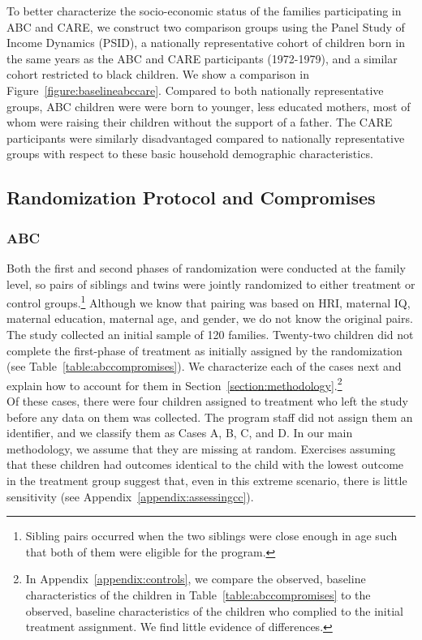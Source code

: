 \noindent To better characterize the socio-economic status of the families participating in ABC and CARE, we construct two comparison groups using the Panel Study of Income Dynamics (PSID), a nationally representative cohort of children born in the same years as the ABC and CARE participants (1972-1979), and a similar cohort restricted to black children. We show a comparison in Figure~\ref{figure:baselineabccare}. Compared to both nationally representative groups, ABC children were were born to younger, less educated mothers, most of whom were raising their children without the support of a father. The CARE participants were similarly disadvantaged compared to nationally representative groups with respect to these basic household demographic characteristics.\\

\subsection{Randomization Protocol and Compromises} \label{section:randomization}

\subsubsection{ABC}

\noindent Both the first and second phases of randomization were conducted at the family level, so pairs of siblings and twins were jointly randomized to either treatment or control groups.\footnote{Sibling pairs occurred when the two siblings were close enough in age such that both of them were eligible for the program.} Although we know that pairing was based on HRI, maternal IQ, maternal education, maternal age, and gender, we do not know the original pairs. The study collected an initial sample of 120 families. Twenty-two children did not complete the first-phase of treatment as initially assigned by the randomization (see Table~\ref{table:abccompromises}). We characterize each of the cases next and explain how to account for them in Section~\ref{section:methodology}.\footnote{In Appendix~\ref{appendix:controls}, we compare the observed, baseline characteristics of the children in Table~\ref{table:abccompromises} to the observed, baseline characteristics of the children who complied to the initial treatment assignment. We find little evidence of differences.}\\

\noindent Of these cases, there were four children assigned to treatment who left the study before any data on them was collected. The program staff did not assign them an identifier, and we classify them as Cases A, B, C, and D. In our main methodology, we assume that they are missing at random. Exercises assuming that these children had outcomes identical to the child with the lowest outcome in the treatment group suggest that, even in this extreme scenario, there is little sensitivity (see Appendix~\ref{appendix:assessingcc}).\\

